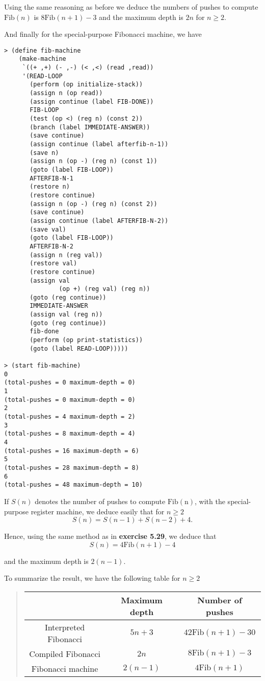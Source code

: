 \documentclass[a4paper,12pt]{article}
\begin{document}
Using the same reasoning as before we deduce the numbers of pushes to
compute $\mathrm{Fib}(n)$ is $8 \mathrm{Fib}(n+1)-3$ and the maximum
depth is $2 n$ for $n \ge 2$.

And finally for the special-purpose Fibonacci machine, we have

\begin{lstlisting}
> (define fib-machine
    (make-machine
     `((+ ,+) (- ,-) (< ,<) (read ,read))
     '(READ-LOOP
       (perform (op initialize-stack))
       (assign n (op read))
       (assign continue (label FIB-DONE))
       FIB-LOOP
       (test (op <) (reg n) (const 2))
       (branch (label IMMEDIATE-ANSWER))
       (save continue)
       (assign continue (label afterfib-n-1))
       (save n)
       (assign n (op -) (reg n) (const 1))
       (goto (label FIB-LOOP))
       AFTERFIB-N-1
       (restore n)
       (restore continue)
       (assign n (op -) (reg n) (const 2))
       (save continue)
       (assign continue (label AFTERFIB-N-2))
       (save val)
       (goto (label FIB-LOOP))
       AFTERFIB-N-2
       (assign n (reg val))
       (restore val)
       (restore continue)
       (assign val
               (op +) (reg val) (reg n))
       (goto (reg continue))
       IMMEDIATE-ANSWER
       (assign val (reg n))
       (goto (reg continue))
       fib-done
       (perform (op print-statistics))
       (goto (label READ-LOOP)))))

> (start fib-machine)
0
(total-pushes = 0 maximum-depth = 0)
1
(total-pushes = 0 maximum-depth = 0)
2
(total-pushes = 4 maximum-depth = 2)
3
(total-pushes = 8 maximum-depth = 4)
4
(total-pushes = 16 maximum-depth = 6)
5
(total-pushes = 28 maximum-depth = 8)
6
(total-pushes = 48 maximum-depth = 10)
\end{lstlisting}

If $S(n)$ denotes the number of pushes to compute $\mathrm{Fib(n)}$,
with the special-purpose register machine, we deduce easily that for
$n \ge 2$
\[ S(n) = S(n-1) + S(n-2) + 4.\]

Hence, using the same method as in \textbf{exercise 5.29}, we deduce
that
\[ S(n) = 4 \mathrm{Fib}(n+1) - 4\]

and the maximum depth is $2(n-1)$.

\medskip
To summarize the result, we have the following table for $n \ge 2$

\begin{quote}
  \begin{tabular}{|c|c|c|}
    \hline &Maximum depth& Number of pushes \\
    \hline Interpreted Fibonacci & $5n+3$ & $42\mathrm{Fib}(n+1)-30$ \\
    \hline Compiled Fibonacci & $2n$ & $8\mathrm{Fib}(n+1)-3$ \\
    \hline Fibonacci machine & $2(n-1)$ & $4\mathrm{Fib}(n+1)$ \\
    \hline
  \end{tabular}
\end{quote}
\end{document}
